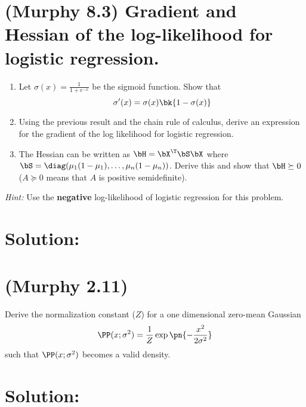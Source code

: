 \documentclass[189]{pset}
\begin{document}

  \section{(Murphy 8.3) Gradient and Hessian of the log-likelihood for
    logistic regression.}

    \begin{enumerate}
      \item Let $\sigma(x) = \frac{1}{1 + e^{-x}}$ be the sigmoid
        function. Show that
        \[
          \sigma'(x) = \sigma(x)\bk{1 - \sigma(x)}
        \]
      \item Using the previous result and the chain rule of calculus,
        derive an expression for the gradient of the log likelihood
        for logistic regression.
      \item The Hessian can be written as $\bH=\bX^\T\bS\bX$ where
        $\bS = \diag(\mu_1(1-\mu_1), \dots, \mu_n(1-\mu_n))$. Derive
        this and show that $\bH \succeq 0$ ($A \succeq 0$ means that
        $A$ is positive semidefinite).
    \end{enumerate}

    \textit{Hint:} Use the \textbf{negative} log-likelihood of
    logistic regression for this problem.

  \hrulefill

  \section*{Solution:}

  \clearpage


  \section{(Murphy 2.11)}
    Derive the normalization constant ($Z$) for a one dimensional
    zero-mean Gaussian
    \[
      \PP(x; \sigma^2) = \frac{1}{Z}\exp\pn{-\frac{x^2}{2\sigma^2}}
    \]
    such that $\PP(x; \sigma^2)$ becomes a valid density.

  \hrulefill

  \section*{Solution:}

  \clearpage
\end{document}
